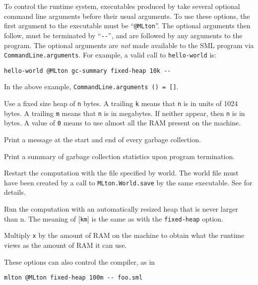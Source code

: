 
To control the runtime system, executables produced by {\mlton} take
several optional command line arguments before their usual arguments.
To use these options, the first argument to the executable must be
``\verb+@MLton+''.  The optional arguments then follow, must be
terminated by ``\verb+--+'', and are followed by any arguments to the program.
The optional arguments are {\em not} made available to the SML
program via {\tt CommandLine.arguments}.  For example, a valid call
to {\tt hello-world} is: 
\begin{verbatim}
hello-world @MLton gc-summary fixed-heap 10k --
\end{verbatim}
In the above example, {\tt CommandLine.arguments () = []}.

\begin{description}
 Use a fixed size heap of {\tt n} bytes.
 A trailing {\tt k} means that {\tt n} is in units of 1024 bytes. 
 A trailing {\tt m} means that {\tt n} is in megabytes. 
 If neither appear, then {\tt n} is in bytes.
 A value of {\tt 0} means to use almost all the RAM present on the
 machine.

Print a message at the start and end of every garbage collection.

Print a summary of garbage collection statistics upon program
termination.

Restart the computation with the file specified by world.
The world file must have been created by a call to
{\tt MLton.World.save} by the same executable.  See 
for details.

Run the computation with an automatically resized heap that is never
larger than n.  The meaning of [{\tt km}] is the same as with the
{\tt fixed-heap} option.

Multiply {\tt x} by the amount of RAM on the machine to obtain what
the runtime views as the amount of RAM it can use.
\end{description}
These options can also control the compiler, as in
\begin{verbatim}
mlton @MLton fixed-heap 100m -- foo.sml
\end{verbatim}
